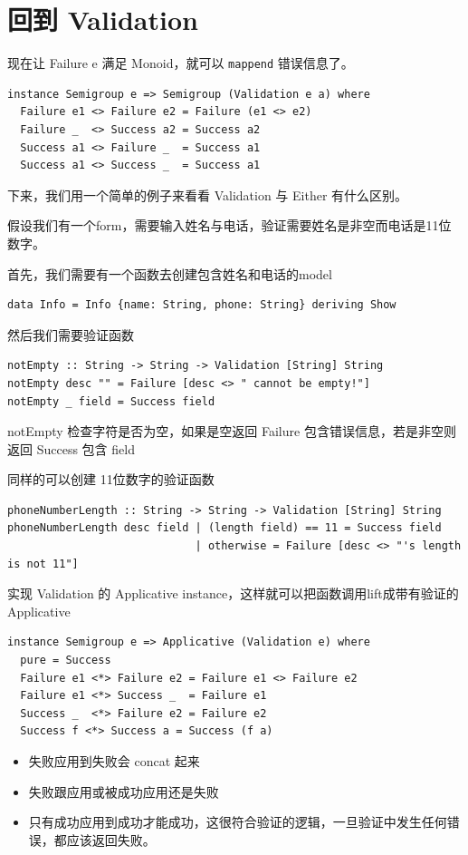 \documentclass[letterspacing]{tufte-book}
\begin{document}
\section{回到 Validation}
\label{sec:orgf1319d4}
现在让 Failure e 满足 Monoid，就可以 \texttt{mappend} 错误信息了。
\lstset{language=haskell,label= ,caption= ,captionpos=b,numbers=none}
\begin{lstlisting}
instance Semigroup e => Semigroup (Validation e a) where
  Failure e1 <> Failure e2 = Failure (e1 <> e2)
  Failure _  <> Success a2 = Success a2
  Success a1 <> Failure _  = Success a1
  Success a1 <> Success _  = Success a1
\end{lstlisting}

下来，我们用一个简单的例子来看看 Validation 与 Either 有什么区别。

假设我们有一个form，需要输入姓名与电话，验证需要姓名是非空而电话是11位数字。

首先，我们需要有一个函数去创建包含姓名和电话的model
\lstset{language=haskell,label= ,caption= ,captionpos=b,numbers=none}
\begin{lstlisting}
data Info = Info {name: String, phone: String} deriving Show
\end{lstlisting}

然后我们需要验证函数
\lstset{language=haskell,label= ,caption= ,captionpos=b,numbers=none}
\begin{lstlisting}
notEmpty :: String -> String -> Validation [String] String
notEmpty desc "" = Failure [desc <> " cannot be empty!"]
notEmpty _ field = Success field
\end{lstlisting}
notEmpty 检查字符是否为空，如果是空返回 Failure 包含错误信息，若是非空则返回 Success 包含 field

同样的可以创建 11位数字的验证函数
\lstset{language=haskell,label= ,caption= ,captionpos=b,numbers=none}
\begin{lstlisting}
phoneNumberLength :: String -> String -> Validation [String] String
phoneNumberLength desc field | (length field) == 11 = Success field
                             | otherwise = Failure [desc <> "'s length is not 11"]
\end{lstlisting}
实现 Validation 的 Applicative instance，这样就可以把函数调用lift成带有验证的 Applicative
\lstset{language=haskell,label= ,caption= ,captionpos=b,numbers=none}
\begin{lstlisting}
instance Semigroup e => Applicative (Validation e) where
  pure = Success
  Failure e1 <*> Failure e2 = Failure e1 <> Failure e2
  Failure e1 <*> Success _  = Failure e1
  Success _  <*> Failure e2 = Failure e2
  Success f <*> Success a = Success (f a)
\end{lstlisting}
\begin{itemize}
\item 失败应用到失败会 concat 起来
\item 失败跟应用或被成功应用还是失败
\item 只有成功应用到成功才能成功，这很符合验证的逻辑，一旦验证中发生任何错误，都应该返回失败。
\end{itemize}
\end{document}
